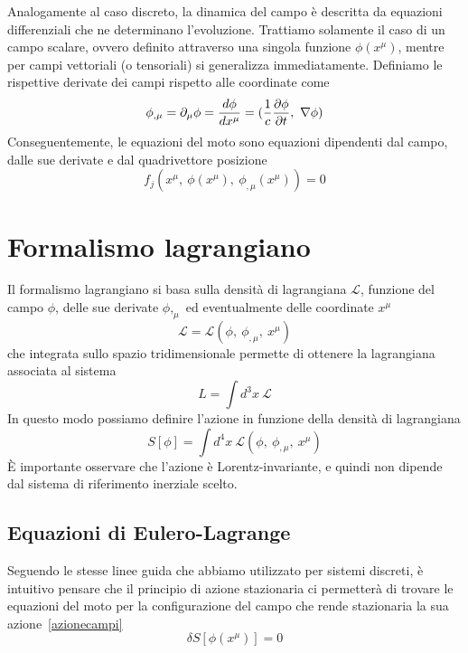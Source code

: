     Analogamente al caso discreto, la dinamica del campo è descritta da equazioni differenziali che ne determinano l'evoluzione. Trattiamo solamente il caso di un campo scalare, ovvero definito attraverso una singola funzione $\phi(x^\mu)$, mentre per campi vettoriali (o tensoriali) si generalizza immediatamente. Definiamo le rispettive derivate dei campi rispetto alle coordinate come
    \begin{equation*}
        \phi_{, \mu} = \partial_\mu \phi = \frac{d\phi}{dx^\mu} = (\frac{1}{c} \frac{\partial\phi}{\partial t}, ~ \nabla \phi)
    \end{equation*}
    Conseguentemente, le equazioni del moto sono equazioni dipendenti dal campo, dalle sue derivate e dal quadrivettore posizione
    \begin{equation} \label{motocampi}
        f_j(x^\mu, ~\phi(x^\mu), ~\phi_{, \mu}(x^\mu)) = 0
    \end{equation}

\section{Formalismo lagrangiano}    

    Il formalismo lagrangiano si basa sulla densità di lagrangiana $\mathcal L$, funzione del campo $\phi$, delle sue derivate $\phi,_\mu$ ed eventualmente delle coordinate $x^\mu$
    \begin{equation*} 
        \mathcal L = \mathcal L (\phi,~\phi_{, \mu},~x^\mu)
    \end{equation*}
    che integrata sullo spazio tridimensionale permette di ottenere la lagrangiana associata al sistema
    \begin{equation*}
        L = \int d^3 x ~ \mathcal L
    \end{equation*}
    In questo modo possiamo definire l'azione in funzione della densità di lagrangiana
    \begin{equation} \label{azionecampi}
        S[\phi] = \int d^4 x ~ \mathcal L (\phi,~\phi_{, \mu},~x^\mu)
    \end{equation}
    È importante osservare che l'azione è Lorentz-invariante, e quindi non dipende dal sistema di riferimento inerziale scelto.

\subsection{Equazioni di Eulero-Lagrange}

    Seguendo le stesse linee guida che abbiamo utilizzato per sistemi discreti, è intuitivo pensare che il principio di azione stazionaria ci permetterà di trovare le equazioni del moto per la configurazione del campo che rende stazionaria la sua azione~\eqref{azionecampi}
    \begin{equation} \label{azionestazionariacampi}
        \delta S [\phi(x^\mu)] = 0
    \end{equation}

